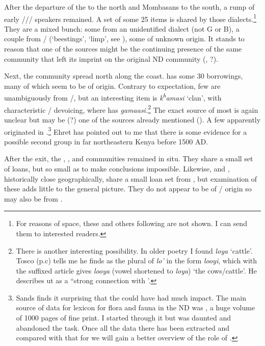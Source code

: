 \documentclass[output=paper
,newtxmath
,modfonts
,nonflat]{langsci/langscibook}
\begin{document}
  After the departure of the  to the north and Mombasans to the south, a rump of early /// speakers remained.  A set of some 25 items is shared by those dialects.\footnote{For reasons of space, these and others following are not shown. I can send them to interested readers.}  They are a mixed bunch: some from an unidentified  dialect (not G or B), a couple from / (‘beestings’, ‘limp’, see ), some of unknown origin. It stands to reason that one of the sources might be the continuing presence of the same  community that left its imprint on the original ND community (, ?).

  Next, the  community spread north along the coast.  has some 30 borrowings, many of which seem to be of  origin. Contrary to expectation, few are unambiguously from /, but an interesting item is \textit{k\textsuperscript{h}}\textit{amasi} ‘clan’, with characteristic / devoicing, where  has \textit{gamaasi.}\footnote{There is another interesting possibility. In older  poetry I found \textit{loya} ‘cattle’. Tosco (p.c) tells me he finds as the plural of \textit{lo’} in  the form \textit{looyi}, which with the suffixed article gives \textit{looya} (vowel shortened to  \textit{loya}) ‘the cows/cattle’. He describes ut as a “strong connection with ’.} The exact  source of most is again unclear but may be (?) one of the sources already mentioned (). A few apparently originated in .\footnote{Sands finds it surprising that the  could have had much impact. The main source of data for lexicon for flora and fauna in the ND was \citet{Sacleux1939}, a huge volume of 1000 pages of fine print. I started through it but was daunted and abandoned the task. Once all the data there has been extracted and compared with that for  we will gain a better overview of the role of .} Ehret has pointed out to me that there is some evidence for a possible second  group in far northeastern Kenya before 1500 AD. 

  After the  exit, the , , and  communities remained in situ. They share a small set of loans, but so small as to make conclusions impossible. Likewise,  and , historically close geographically, share a small loan set from , but examination of these adds little to the general picture. They do not appear to be of / origin so may also be from . 
\end{document}
